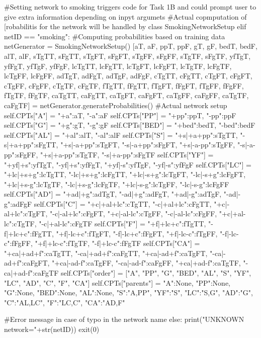 \documentclass[10pt]{article}
\begin{document}
\begin{spverbatim}
        #Setting network to smoking triggers code for Task 1B and could prompt user to give extra information depending on inpyt argumets
        #Actual copmputation of [robabilitis for the network will be handled by class SmokingNetworkSetup
        elif netID == "smoking":
            #Computing probabilities based on training data
            netGenerator = SmokingNetworkSetup()
            [aT, aF,  ppT, ppF, gT,  gF, bedT, bedF, alT, alF, sTgTT, sFgTT, sTgFT, sFgFT, sTgFF, sFgFF, sTgTF, sFgTF, yfTgT,  yfFgT, yfTgF, yfFgF, lcTgTT, lcFgTT, lcTgFT, lcFgFT, lcTgTF, lcFgTF, lcTgFF, lcFgFF, adTgT,  adFgT,  adTgF, adFgF, cTgTT, cFgTT, cTgFT, cFgFT, cTgFF, cFgFF, cTgTF, cFgTF, fTgTT, fFgTT, fTgFT, fFgFT, fTgFF, fFgFF, fTgTF, fFgTF, caTgTT, caFgTT, caTgFT, caFgFT, caTgFF, caFgFF, caTgTF, caFgTF] = netGenerator.generateProbabilities()
            #Actual network setup
            self.CPTs["A"] = {"+a":aT, "-a":aF}
            self.CPTs["PP"] = {"+pp":ppT, "-pp":ppF}
            self.CPTs["G"] = {"+g":gT, "-g":gF}
            self.CPTs["BED"] = {"+bed":bedT, "-bed":bedF}
            self.CPTs["AL"] = {"+al":alT, "-al":alF}
            self.CPTs["S"] = {"+s|+a+pp":sTgTT, "-s|+a+pp":sFgTT, "+s|-a+pp":sTgFT, "-s|-a+pp":sFgFT, "+s|-a-pp":sTgFF, "-s|-a-pp":sFgFF, "+s|+a-pp":sTgTF, "-s|+a-pp":sFgTF}
            self.CPTs["YF"] = {"+yf|+s":yfTgT,  "-yf|+s":yfFgT, "+yf|-s":yfTgF, "-yf|-s":yfFgF}
            self.CPTs["LC"] = {"+lc|+s+g":lcTgTT, "-lc|+s+g":lcFgTT, "+lc|-s+g":lcTgFT, "-lc|-s+g":lcFgFT, "+lc|+s-g":lcTgTF, "-lc|+s-g":lcFgTF, "+lc|-s-g":lcTgFF, "-lc|-s-g":lcFgFF}
            self.CPTs["AD"] = {"+ad|+g":adTgT,  "-ad|+g":adFgT,  "+ad|-g":adTgF, "-ad|-g":adFgF}
            self.CPTs["C"] = {"+c|+al+lc":cTgTT, "-c|+al+lc":cFgTT, "+c|-al+lc":cTgFT, "-c|-al+lc":cFgFT, "+c|-al-lc":cTgFF, "-c|-al-lc":cFgFF, "+c|+al-lc":cTgTF, "-c|+al-lc":cFgTF}
            self.CPTs["F"] = {"+f|+lc+c":fTgTT, "-f|+lc+c":fFgTT, "+f|-lc+c":fTgFT, "-f|-lc+c":fFgFT, "+f|-lc-c":fTgFF, "-f|-lc-c":fFgFF, "+f|+lc-c":fTgTF, "-f|+lc-c":fFgTF}
            self.CPTs["CA"] = {"+ca|+ad+f":caTgTT, "-ca|+ad+f":caFgTT, "+ca|-ad+f":caTgFT, "-ca|-ad+f":caFgFT, "+ca|-ad-f":caTgFF, "-ca|-ad-f":caFgFF, "+ca|+ad-f":caTgTF, "-ca|+ad-f":caFgTF}
            self.CPTs["order"] = ["A", "PP", "G", "BED", "AL", "S", "YF", "LC", "AD", "C", "F", "CA"]
            self.CPTs["parents"] = {"A":None, "PP":None, "G":None, "BED":None, "AL":None, "S":"A,PP", "YF":"S", "LC":"S,G", "AD":"G", "C":"AL,LC", "F":"LC,C", "CA":"AD,F"}
            
        #Error message in case of typo in the network name
        else:
            print("UNKNOWN network="+str(netID))
            exit(0)


\end{spverbatim}
\end{document}

